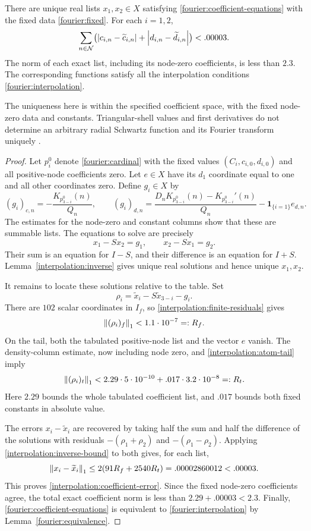 \begin{proposition}
\label{interpolation:solution}
There are unique real lists $x_1,x_2\in X$ satisfying
\eqref{fourier:coefficient-equations} with the fixed data
\eqref{fourier:fixed}.  For each $i=1,2$,
\begin{equation}\label{interpolation:coefficient-error}
 \sum_{n\in\mathcal N}
 \bigl(\left\lvert c_{i,n}-\widetilde c_{i,n}\right\rvert
       +\left\lvert d_{i,n}-\widetilde d_{i,n}\right\rvert\bigr)<.00003.
\end{equation}
The norm of each exact list, including its node-zero coefficients, is
less than $2.3$.  The corresponding functions satisfy all the
interpolation conditions \eqref{fourier:interpolation}.
\end{proposition}

The uniqueness here is within the specified coefficient space, with the
fixed node-zero data and constants. Triangular-shell values and first
derivatives do not determine an arbitrary radial Schwartz function and
its Fourier transform uniquely \cite[Theorem~1.7]{Sardari2021}.

\begin{proof}
Let $p_i^0$ denote \eqref{fourier:cardinal} with the fixed values
$(C_i,c_{i,0},d_{i,0})$ and all positive-node coefficients zero.  Let
$e\in X$ have its $d_1$ coordinate equal to one and all other coordinates
zero.  Define $g_i\in X$ by
\[
 (g_i)_{c,n}=-\frac{K_{p_{3-i}^0}(n)}{Q_n},\qquad
 (g_i)_{d,n}=
 \frac{D_nK_{p_{3-i}^0}(n)-K_{p_{3-i}^0}'(n)}{Q_n}
 -\mathbf1_{\{i=1\}}e_{d,n}.
\]
The estimates for the node-zero and constant columns show that these
are summable lists.  The equations to solve are precisely
\[
 x_1-Sx_2=g_1,\qquad x_2-Sx_1=g_2.
\]
Their sum is an equation for $I-S$, and their difference is an equation
for $I+S$.  Lemma~\ref{interpolation:inverse} gives unique real solutions
and hence unique $x_1,x_2$.

It remains to locate these solutions relative to the table.  Set
\[
 \rho_i=\widetilde x_i-S\widetilde x_{3-i}-g_i.
\]
There are $102$ scalar coordinates in $I_f$, so
\eqref{interpolation:finite-residuals} gives
\[
 \left\lVert(\rho_i)_f\right\rVert_1<1.1\cdot10^{-7}=:R_f.
\]
On the tail, both the tabulated positive-node list and the vector $e$
vanish.  The density-column estimate, now including node zero, and
\eqref{interpolation:atom-tail} imply
\[
 \left\lVert(\rho_i)_t\right\rVert_1
 <2.29\cdot5\cdot10^{-10}+.017\cdot3.2\cdot10^{-8}=:R_t.
\]
Here $2.29$ bounds the whole tabulated coefficient list, and $.017$
bounds both fixed constants in absolute value.

The errors $x_i-\widetilde x_i$ are recovered by taking half the sum
and half the difference of the solutions with residuals
$-(\rho_1+\rho_2)$ and $-(\rho_1-\rho_2)$.  Applying
\eqref{interpolation:inverse-bound} to both gives, for each list,
\[
 \left\lVert x_i-\widetilde x_i\right\rVert_1
 \le2(91R_f+2540R_t)
 =.00002860012<.00003.
\]
This proves \eqref{interpolation:coefficient-error}.  Since the fixed
node-zero coefficients agree, the total exact coefficient norm is
less than $2.29+.00003<2.3$.  Finally,
\eqref{fourier:coefficient-equations} is equivalent to
\eqref{fourier:interpolation} by Lemma~\ref{fourier:equivalence}.
\end{proof}
